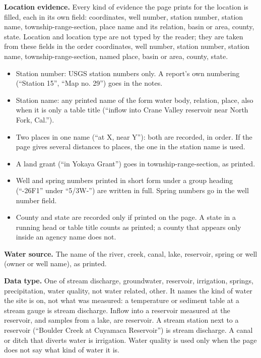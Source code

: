 \textbf{Location evidence.} Every kind of evidence the page prints for the location is filled, each in its own field: coordinates, well number, station number, station name, township-range-section, place name and its relation, basin or area, county, state. Location and location type are not typed by the reader; they are taken from these fields in the order coordinates, well number, station number, station name, township-range-section, named place, basin or area, county, state.

\begin{itemize}
  \item Station number: USGS station numbers only. A report's own numbering (``Station 15'', ``Map no. 29'') goes in the notes.
  \item Station name: any printed name of the form water body, relation, place, also when it is only a table title (``inflow into Crane Valley reservoir near North Fork, Cal.'').
  \item Two places in one name (``at X, near Y''): both are recorded, in order. If the page gives several distances to places, the one in the station name is used.
  \item A land grant (``in Yokaya Grant'') goes in township-range-section, as printed.
  \item Well and spring numbers printed in short form under a group heading (``-26F1'' under ``5/3W-'') are written in full. Spring numbers go in the well number field.
  \item County and state are recorded only if printed on the page. A state in a running head or table title counts as printed; a county that appears only inside an agency name does not.
\end{itemize}

\textbf{Water source.} The name of the river, creek, canal, lake, reservoir, spring or well (owner or well name), as printed.

\textbf{Data type.} One of stream discharge, groundwater, reservoir, irrigation, springs, precipitation, water quality, not water related, other. It names the kind of water the site is on, not what was measured: a temperature or sediment table at a stream gauge is stream discharge. Inflow into a reservoir measured at the reservoir, and samples from a lake, are reservoir. A stream station next to a reservoir (``Boulder Creek at Cuyamaca Reservoir'') is stream discharge. A canal or ditch that diverts water is irrigation. Water quality is used only when the page does not say what kind of water it is.

